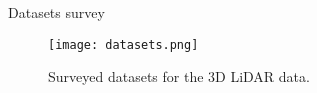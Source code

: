 \documentclass[aspectratio=169]{beamer}
\begin{document}
\begin{frame}{Datasets survey}

    \begin{figure}
        \centering
        \texttt{[image: datasets.png]}
        \caption{Surveyed datasets for the 3D LiDAR data.}
       
    \end{figure}
\end{frame}
\end{document}
